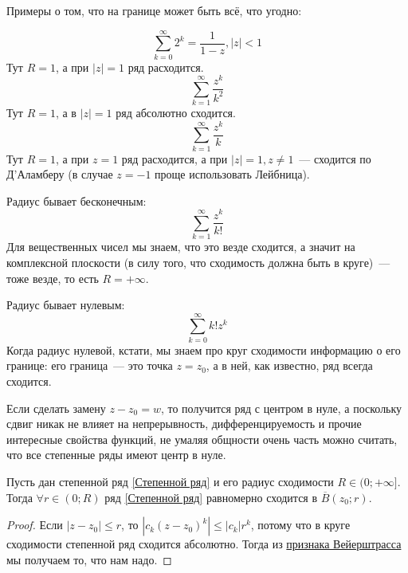 \documentclass{article}
\begin{document}
    \begin{example}
        Примеры о том, что на границе может быть всё, что угодно:
        \begin{multicols}{3}
            $$
            \sum\limits_{k=0}^\infty2^k=\frac1{1-z},|z|<1
            $$
            Тут $R=1$, а при $|z|=1$ ряд расходится.
            \columnbreak
            $$
            \sum\limits_{k=1}^\infty\frac{z^k}{k^2}
            $$
            Тут $R=1$, а в $|z|=1$ ряд абсолютно сходится.
            \columnbreak
            $$
            \sum\limits_{k=1}^\infty\frac{z^k}k
            $$
            Тут $R=1$, а при $z=1$ ряд расходится, а при $|z|=1,z\neq1$~--- сходится по Д'Аламберу (в случае $z=-1$ проще использовать Лейбница).
        \end{multicols}
    \end{example}
    \begin{example}
        Радиус бывает бесконечным:
        $$
        \sum\limits_{k=1}^\infty\frac{z^k}{k!}
        $$
        Для вещественных чисел мы знаем, что это везде сходится, а значит на комплексной плоскости (в силу того, что сходимость должна быть в круге)~--- тоже везде, то есть $R=+\infty$.
    \end{example}
    \begin{example}
        Радиус бывает нулевым:
        $$
        \sum\limits_{k=0}^\infty k!z^k
        $$
        Когда радиус нулевой, кстати, мы знаем про круг сходимости информацию о его границе: его граница~--- это точка $z=z_0$, а в ней, как известно, ряд всегда сходится.
    \end{example}
    \begin{remark}
        Если сделать замену $z-z_0=w$, то получится ряд с центром в нуле, а поскольку сдвиг никак не влияет на непрерывность, дифференцируемость и прочие интересные свойства функций, не умаляя общности очень часть можно считать, что все степенные ряды имеют центр в нуле.
    \end{remark}
    \begin{theorem}
        \label{Равномерная сходимость степенных рядов}
        Пусть дан степенной ряд \ref{Степенной ряд} и его радиус сходимости $R\in(0;+\infty]$. Тогда $\forall r\in(0;R)$ ряд \ref{Степенной ряд} равномерно сходится в $\overline B(z_0;r)$.
    \end{theorem}
    \begin{proof}
        Если $|z-z_0|\leqslant r$, то $|c_k(z-z_0)^k|\leqslant |c_k|r^k$, потому что в круге сходимости степенной ряд сходится абсолютно. Тогда из \hyperref[Признак Вейерштрасса]{признака Вейерштрасса} мы получаем то, что нам надо.
    \end{proof}
\end{document}
